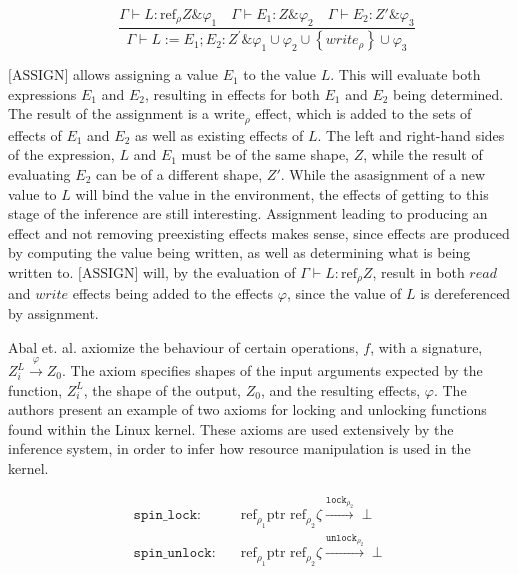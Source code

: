 \begin{equation*}
    [\text{ASSIGN}] \quad \frac{\Gamma \vdash L: \mathrm{ref}_{\rho} Z \& \varphi_{1} \quad \Gamma \vdash E_{1}: Z \& \varphi_{2} \quad \Gamma \vdash E_{2}: Z' \& \varphi_{3}}{\Gamma \vdash L:=E_{1} ; E_{2}: Z^{\prime} \& \varphi_{1} \cup \varphi_{2} \cup\left\{w r i t e_{\rho}\right\} \cup \varphi_{3}}
\end{equation*}

\newpar $\text{[ASSIGN]}$ allows assigning a value $E_1$ to the value $L$. This will evaluate both expressions $E_1$ and $E_2$, resulting in effects for both $E_1$ and $E_2$ being determined. The result of the assignment is a $\text{write}_\rho$ effect, which is added to the sets of effects of $E_1$ and $E_2$ as well as existing effects of $L$. The left and right-hand sides of the expression, $L$ and $E_1$ must be of the same shape, $Z$, while the result of evaluating $E_2$ can be of a different shape, $Z'$. While the asasignment of a new value to $L$ will bind the value in the environment, the effects of getting to this stage of the inference are still interesting. Assignment leading to producing an effect and not removing preexisting effects makes sense, since effects are produced by computing the value being written, as well as determining what is being written to. $\text{[ASSIGN]}$ will, by the evaluation of $\Gamma \vdash L: \text{ref}_{\rho} Z$, result in both $read$ and $write$ effects being added to the effects $\varphi$, since the value of $L$ is dereferenced by assignment. 

\newpar Abal et. al. axiomize the behaviour of certain operations, $f$, with a signature, $Z_{i}^{L} \stackrel{\varphi}{\rightarrow} Z_0$. The axiom specifies shapes of the input arguments expected by the function, $Z_{i}^{L}$, the shape of the output, $Z_0$, and the resulting effects, $\varphi$. The authors present an example of two axioms for locking and unlocking functions found within the Linux kernel. These axioms are used extensively by the inference system, in order to infer how resource manipulation is used in the kernel. 

\begin{equation*}
\begin{aligned}
        \texttt{spin\_lock}: \quad & \text{ref}_{\rho_1} \text{ptr } \text{ref}_{\rho_2} \zeta \xrightarrow{{\texttt{lock}}_{\rho_2}}\perp \\
        \texttt{spin\_unlock}: \quad & \text{ref}_{\rho_1} \text{ptr } \text{ref}_{\rho_2} \zeta \xrightarrow{{\texttt{unlock}}_{\rho_2}}\perp
\end{aligned}
\end{equation*}

